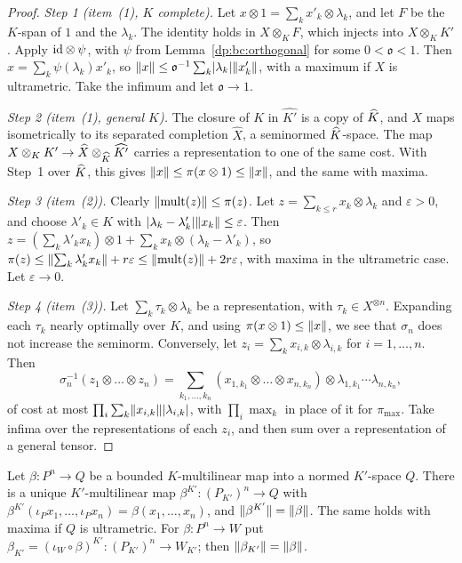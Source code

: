 \begin{proof}
\emph{Step 1 (item~(1), $K$ complete).} Let $x\otimes1=\sum_kx'_k\otimes\lambda_k$, and let $F$ be the $K$-span of $1$ and the $\lambda_k$. The identity holds in $X\otimes_KF$, which injects into $X\otimes_KK'$. Apply $\mathrm{id}\otimes\psi$, with $\psi$ from Lemma~\ref{dp:bc:orthogonal} for some $0<\mathfrak o<1$. Then $x=\sum_k\psi(\lambda_k)x'_k$, so $\lVert x\rVert\le\mathfrak o^{-1}\sum_k\lvert \lambda_k\rvert\lVert x'_k\rVert$, with a maximum if $X$ is ultrametric. Take the infimum and let $\mathfrak o\to1$.

\emph{Step 2 (item~(1), general $K$).} The closure of $K$ in $\widehat{K'}$ is a copy of $\widehat K$, and $X$ maps isometrically to its separated completion $\widehat X$, a seminormed $\widehat K$-space. The map $X\otimes_KK'\to\widehat X\otimes_{\widehat K}\widehat{K'}$ carries a representation to one of the same cost. With Step~1 over $\widehat K$, this gives $\lVert x\rVert\le\pi(x\otimes1)\le\lVert x\rVert$, and the same with maxima.

\emph{Step 3 (item~(2)).} Clearly $\lVert \mathrm{mult}(z)\rVert\le\pi(z)$. Let $z=\sum_{k\le r}x_k\otimes\lambda_k$ and $\varepsilon>0$, and choose $\lambda'_k\in K$ with $\lvert \lambda_k-\lambda'_k\rvert\lVert x_k\rVert\le\varepsilon$. Then $z=(\sum_k\lambda'_kx_k)\otimes1+\sum_kx_k\otimes(\lambda_k-\lambda'_k)$, so $\pi(z)\le\lVert \sum_k\lambda'_kx_k\rVert+r\varepsilon\le\lVert \mathrm{mult}(z)\rVert+2r\varepsilon$, with maxima in the ultrametric case. Let $\varepsilon\to0$.

\emph{Step 4 (item~(3)).} Let $\sum_k\tau_k\otimes\lambda_k$ be a representation, with $\tau_k\in X^{\otimes n}$. Expanding each $\tau_k$ nearly optimally over $K$, and using $\pi(x\otimes1)\le\lVert x\rVert$, we see that $\sigma_n$ does not increase the seminorm. Conversely, let $z_i=\sum_kx_{i,k}\otimes\lambda_{i,k}$ for $i=1,\dots,n$. Then
\begin{equation}\label{dp:bc:sigma-inverse}
 \sigma_n^{-1}(z_1\otimes\dots\otimes z_n)=\sum_{k_1,\dots,k_n}(x_{1,k_1}\otimes\dots\otimes x_{n,k_n})\otimes\lambda_{1,k_1}\cdots\lambda_{n,k_n},
\end{equation}
of cost at most $\prod_i\sum_k\lVert x_{i,k}\rVert\lvert \lambda_{i,k}\rvert$, with $\prod_i\max_k$ in place of it for $\pi_{\max}$. Take infima over the representations of each $z_i$, and then sum over a representation of a general tensor.
\end{proof}

\begin{theorem}\label{dp:thm:base-change-multilinear}
Let $\beta\colon P^n\to Q$ be a bounded $K$-multilinear map into a normed $K'$-space $Q$. There is a unique $K'$-multilinear map $\beta^{K'}\colon(P_{K'})^n\to Q$ with $\beta^{K'}(\iota_Px_1,\dots,\iota_Px_n)=\beta(x_1,\dots,x_n)$, and $\lVert \beta^{K'}\rVert=\lVert \beta\rVert$. The same holds with maxima if $Q$ is ultrametric. For $\beta\colon P^n\to W$ put $\beta_{K'}=(\iota_W\circ\beta)^{K'}\colon(P_{K'})^n\to W_{K'}$; then $\lVert \beta_{K'}\rVert=\lVert \beta\rVert$.
\end{theorem}

